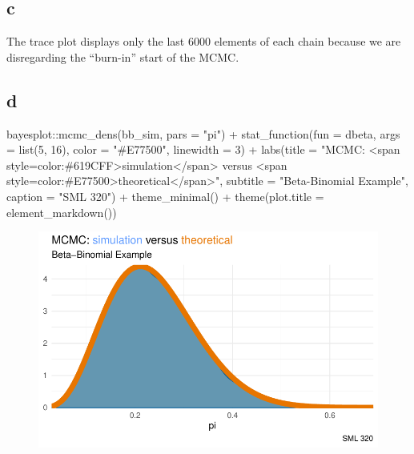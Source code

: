 \documentclass[
  letterpaper,
  DIV=11,
  numbers=noendperiod]{scrartcl}
\newenvironment{Shaded}{\begin{snugshade}}{\end{snugshade}}
\newcommand{\AttributeTok}[1]{\textcolor[rgb]{0.40,0.45,0.13}{#1}}
\newcommand{\DecValTok}[1]{\textcolor[rgb]{0.68,0.00,0.00}{#1}}
\newcommand{\FunctionTok}[1]{\textcolor[rgb]{0.28,0.35,0.67}{#1}}
\newcommand{\NormalTok}[1]{\textcolor[rgb]{0.00,0.23,0.31}{#1}}
\newcommand{\SpecialCharTok}[1]{\textcolor[rgb]{0.37,0.37,0.37}{#1}}
\newcommand{\StringTok}[1]{\textcolor[rgb]{0.13,0.47,0.30}{#1}}
\begin{document}
\hypertarget{c-3}{%
\subsection{c}\label{c-3}}

The trace plot displays only the last 6000 elements of each chain
because we are disregarding the ``burn-in'' start of the MCMC.

\hypertarget{d-3}{%
\subsection{d}\label{d-3}}

\begin{Shaded}
\begin{Highlighting}[]
\NormalTok{bayesplot}\SpecialCharTok{::}\FunctionTok{mcmc\_dens}\NormalTok{(bb\_sim, }\AttributeTok{pars =} \StringTok{"pi"}\NormalTok{) }\SpecialCharTok{+} 
  \FunctionTok{stat\_function}\NormalTok{(}\AttributeTok{fun =}\NormalTok{ dbeta, }\AttributeTok{args =} \FunctionTok{list}\NormalTok{(}\DecValTok{5}\NormalTok{, }\DecValTok{16}\NormalTok{),}
                \AttributeTok{color =} \StringTok{"\#E77500"}\NormalTok{, }\AttributeTok{linewidth =} \DecValTok{3}\NormalTok{) }\SpecialCharTok{+} 
  \FunctionTok{labs}\NormalTok{(}\AttributeTok{title =} \StringTok{"MCMC: \textless{}span style=\textquotesingle{}color:\#619CFF\textquotesingle{}\textgreater{}simulation\textless{}/span\textgreater{} versus \textless{}span style=\textquotesingle{}color:\#E77500\textquotesingle{}\textgreater{}theoretical\textless{}/span\textgreater{}"}\NormalTok{,}
         \AttributeTok{subtitle =} \StringTok{"Beta{-}Binomial Example"}\NormalTok{,}
         \AttributeTok{caption =} \StringTok{"SML 320"}\NormalTok{) }\SpecialCharTok{+}
  \FunctionTok{theme\_minimal}\NormalTok{() }\SpecialCharTok{+}
  \FunctionTok{theme}\NormalTok{(}\AttributeTok{plot.title =} \FunctionTok{element\_markdown}\NormalTok{())}
\end{Highlighting}
\end{Shaded}

\begin{figure}[H]

{\centering \includegraphics{ps4_code_files/figure-pdf/unnamed-chunk-20-1.pdf}

}

\end{figure}
\end{document}
